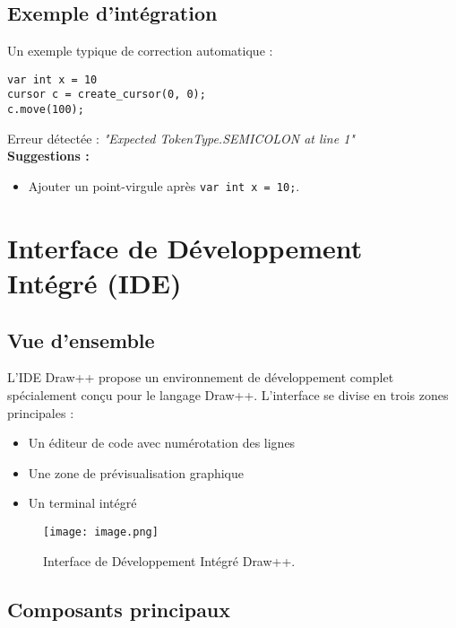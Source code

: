 \documentclass[12pt,a4paper]{report}
\begin{document}
\section{Exemple d'intégration}

Un exemple typique de correction automatique :
\begin{lstlisting}[language=draw++]
var int x = 10
cursor c = create_cursor(0, 0);
c.move(100);
\end{lstlisting}

Erreur détectée : \textit{"Expected TokenType.SEMICOLON at line 1"} \\
\textbf{Suggestions :}
\begin{itemize}
    \item Ajouter un point-virgule après \texttt{var int x = 10;}.
\end{itemize}

\chapter{Interface de Développement Intégré (IDE)}

\section{Vue d'ensemble}
L'IDE Draw++ propose un environnement de développement complet spécialement conçu pour le langage Draw++. L'interface se divise en trois zones principales :
\begin{itemize}
    \item Un éditeur de code avec numérotation des lignes
    \item Une zone de prévisualisation graphique
    \item Un terminal intégré
\end{itemize}
\begin{figure}
    \centering
    \texttt{[image: image.png]}
    \caption{Interface de Développement Intégré Draw++.}
    \label{fig:enter-label}
\end{figure}

\section{Composants principaux}
\end{document}
